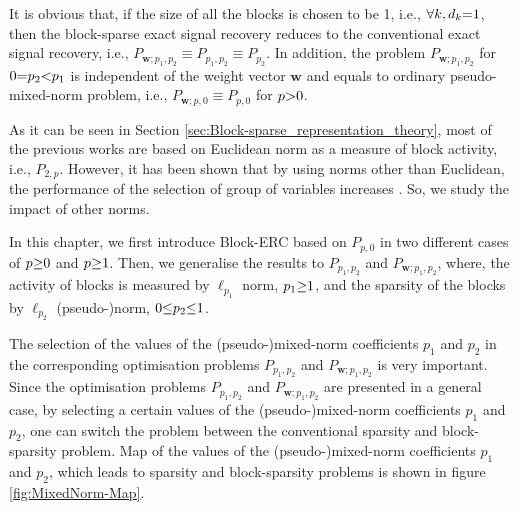 It is obvious that, if the size of all the blocks is chosen to be 1, i.e., $\forall k, d_k {=} 1$, then the block-sparse exact signal recovery reduces to the conventional exact signal recovery, i.e., $P_{\boldsymbol{w};p_1,p_2} {\equiv} P_{p_1,p_2} {\equiv} P_{p_2}$.
In addition, the problem $P_{\boldsymbol{w};p_1,p_2}$ for $0 {=} p_2 {<} p_1$ is independent of the weight vector $\boldsymbol{w}$ and equals to ordinary pseudo-mixed-norm problem, i.e., $P_{\boldsymbol{w};p,0} {\equiv} P_{p,0}$ for $p {>} 0$.

As it can be seen in Section \ref{sec:Block-sparse_representation_theory}, most of the previous works are based on Euclidean norm as a measure of block activity, i.e., $P_{2,p}$. However, it has been shown that by using norms other than Euclidean, the performance of the selection of group of variables increases \cite{Zhao2009}.
So, we study the impact of other norms.

In this chapter, we first introduce Block-ERC based on $P_{p,0}$ in two different cases of $p {\geq} 0$ and $p {\geq} 1$. 
Then, we generalise the results to $P_{p_1,p_2}$ and $P_{\boldsymbol{w};p_1,p_2}$, where, the activity of blocks is measured by $\ell_{p_1}$ norm, $p_1 {\geq} 1$, and the sparsity of the blocks by $\ell_{p_2}$ (pseudo-)norm, $0 {\leq} p_2 {\leq} 1$.


The selection of the values of the (pseudo-)mixed-norm coefficients $p_1$ and $p_2$ in the corresponding optimisation problems $P_{p_1,p_2}$ and $P_{\boldsymbol{w};p_1,p_2}$ is very important. 
Since the optimisation problems $P_{p_1,p_2}$ and $P_{\boldsymbol{w};p_1,p_2}$ are presented in a general case, by selecting a certain values of the (pseudo-)mixed-norm coefficients $p_1$ and $p_2$, one can switch the problem between the conventional sparsity and block-sparsity problem.
Map of the values of the (pseudo-)mixed-norm coefficients $p_1$ and $p_2$, which leads to sparsity and block-sparsity problems is shown in figure \ref{fig:MixedNorm-Map}.


